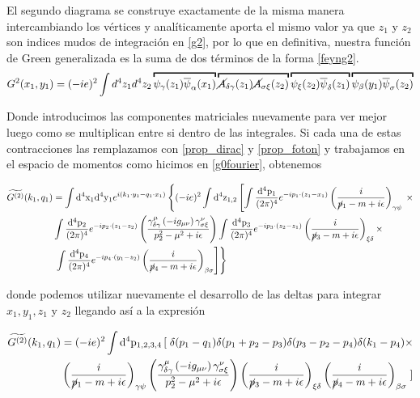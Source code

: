 \documentclass{article}
\numberwithin{equation}{section}
\begin{document}
El segundo diagrama se construye exactamente de la misma manera intercambiando
los vértices y analíticamente aporta el mismo valor ya que $ z_1 $ y $ z_2 $ son indices mudos de integración en \ref{g2}, por lo que en
definitiva, nuestra función de Green generalizada es la suma de dos
términos de la forma \ref{feyng2}.
\begin{equation}
G^{2}(x_{1},y_{1})=(-ie)^{2}\int d^{4}z_{1}d^{4}z_{2}\overbracket{\psi_{\gamma}(z_{1})\overline{\psi}_{\alpha}(x_{1})}\overbracket{\cancel{A}_{\delta\gamma}(z_{1})\cancel{A}_{\sigma\xi}(z_{2})}\overbracket{\psi_{\xi}(z_{2})\overline{\psi}_{\delta}(z_{1})}\overbracket{\psi_{\beta}(y_{1})\overline{\psi}_{\sigma}(z_{2})}
\end{equation}

Donde introducimos las componentes matriciales nuevamente para ver
mejor luego como se multiplican entre si dentro de las integrales.
Si cada una de estas contracciones las remplazamos con \ref{prop_dirac} y \ref{prop_foton} y trabajamos
en el espacio de momentos como hicimos en \ref{g0fourier}, obtenemos

\begin{equation}\label{key}
\begin{aligned}
\widetilde{G^{(2)}}(k_{1},q_{1})&=\int \mathrm{d^4x_1}\mathrm{d^4y_1} e^{i (k_1 \cdot y_1 - q_1 \cdot x_1)} \left\{  (-ie)^{2}\int \mathrm{d^{4}z_{1,2}}  \left[  \int\frac{\mathrm{d^{4}p_1}}{(2\pi)^{4}}e^{-ip_1\cdot(z_{1}-x_{1})}\left(\frac{i}{\cancel{p}_1-m+i\epsilon}\right)_{\gamma\psi} \right. \right. \times \\ &\int\frac{\mathrm{d^{4}p_2}}{(2\pi)^{4}}e^{-ip_2\cdot(z_1-z_2)}\left(\frac{\gamma_{\delta\gamma}^{\mu} \left(-ig_{\mu\nu}\right) \gamma_{\sigma\xi}^{\nu}}{p^2_2 -\mu^2 +i\epsilon}\right) \int\frac{\mathrm{d^{4}p_3}}{(2\pi)^{4}}e^{-ip_3\cdot(z_{2}-z_{1})}\left(\frac{i}{\cancel{p}_3-m+i\epsilon}\right)_{\xi\delta} \times \\
& \left. \left. \int\frac{\mathrm{d^{4}p_4}}{(2\pi)^{4}}e^{-ip_4\cdot(y_{1}-z_{2})}\left(\frac{i}{\cancel{p}_4-m+i\epsilon}\right)_{\beta\sigma}  \right]  \right\}
\end{aligned}
\end{equation}

donde podemos utilizar nuevamente el desarrollo de las deltas para integrar $ x_1, y_1, z_1 $ y $ z_2 $  llegando así a la expresión

\begin{equation}\label{key}
\begin{aligned}
\widetilde{G^{(2)}}(k_{1},q_{1})&=(-ie)^{2} \int \mathrm{d^{4}p_{1,2,3,4}}  \left[ \right. \delta (p_1 -q_1) \delta(p_1 + p_2 - p_3) \delta (p_3 - p_2 - p_4) \delta (k_1 - p_4) \times \\
& \left(\frac{i}{\cancel{p}_1-m+i\epsilon}\right)_{\gamma\psi} \left(\frac{\gamma_{\delta\gamma}^{\mu} \left(-ig_{\mu\nu}\right) \gamma_{\sigma\xi}^{\nu}}{p^2_2 -\mu^2 +i\epsilon}\right) \left(\frac{i}{\cancel{p}_3-m+i\epsilon}\right)_{\xi\delta} \left(\frac{i}{\cancel{p}_4-m+i\epsilon}\right)_{\beta\sigma}\left.  \right] 
\end{aligned}
\end{equation}
\end{document}
